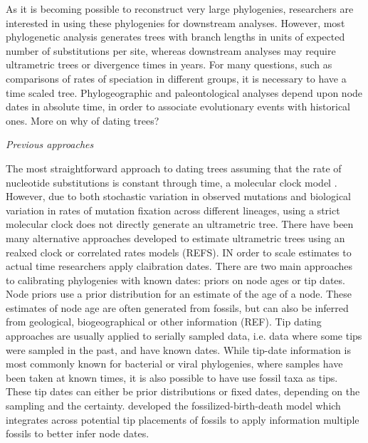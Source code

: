 \documentclass{llncs}
\newcommand{\ejmcomment}[1]{{\color{green} #1}}
\renewcommand{\subsection}[1]{%
\bigskip
\begin{center}
\begin{large}
\normalfont\itshape #1
\end{large}
\end{center}}
\begin{document}
\vspace{1.5in}

As it is becoming possible to reconstruct very large phylogenies, 
researchers are interested in using these phylogenies for downstream analyses.
However, most phylogenetic analysis generates trees with branch lengths in units of expected number of substitutions per site,
whereas downstream analyses may require ultrametric trees or divergence times in years.
For many questions, such as comparisons of rates of speciation in different groups, it is necessary to have a time scaled tree.
Phylogeographic and paleontological analyses depend upon node dates in absolute time,
in order to associate evolutionary events with historical ones.
\ejmcomment{More on why of dating trees?}

\subsection{Previous approaches}
The most straightforward approach to dating trees assuming that the rate of nucleotide 
substitutions is constant through time, a molecular clock model \cite{zuckerkandl1962}.
However, due to both stochastic variation in observed mutations and 
biological variation in rates of mutation fixation across different lineages,
using a strict molecular clock does not directly generate an ultrametric tree.
There have been many alternative approaches developed to estimate
ultrametric trees using an realxed clock or correlated rates models (REFS).
IN order to scale estimates to actual time researchers apply claibration dates. 
There are two main approaches to calibrating phylogenies with known dates:
priors on node ages or tip dates.
Node priors use a prior distribution for an estimate of the age of a node.
These estimates of node age are often generated from fossils,
but can also be inferred from geological, biogeographical or other information (REF).
Tip dating approaches are usually applied to serially sampled data, i.e. data where some tips were sampled in the past, and have known dates.
While tip-date information is most commonly known for bacterial or viral phylogenies,
where samples have been taken at known times,
it is also possible to have use fossil taxa as tips.
These tip dates can either be prior distributions or fixed dates, depending on the sampling and the certainty.
\citet{Heath2014} developed the fossilized-birth-death model which 
integrates across potential tip placements of fossils
to apply information multiple fossils to better infer node dates.
\end{document}
